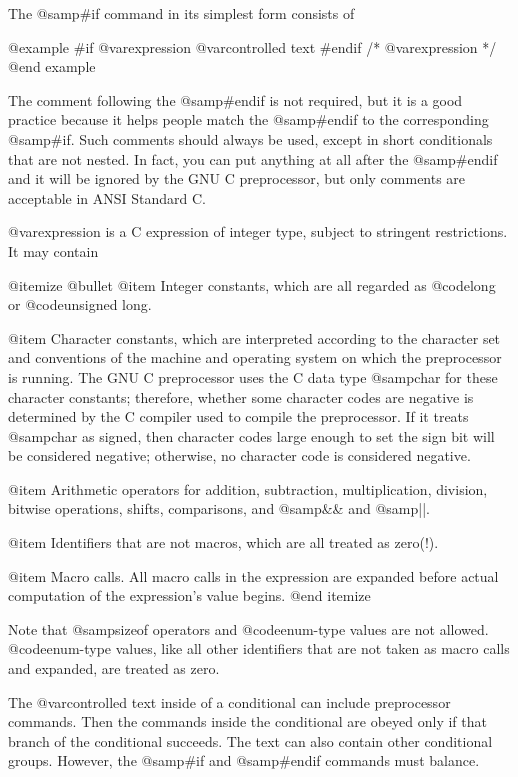 {{The @samp{#if} command in its simplest form consists of

@example
#if @var{expression}
@var{controlled text}
#endif /* @var{expression} */
@end example

The comment following the @samp{#endif} is not required, but it is a good
practice because it helps people match the @samp{#endif} to the
corresponding @samp{#if}.  Such comments should always be used, except in
short conditionals that are not nested.  In fact, you can put anything at
all after the @samp{#endif} and it will be ignored by the GNU C preprocessor,
but only comments are acceptable in ANSI Standard C.

@var{expression} is a C expression of integer type, subject to stringent
restrictions.  It may contain

@itemize @bullet
@item
Integer constants, which are all regarded as @code{long} or
@code{unsigned long}.

@item
Character constants, which are interpreted according to the character
set and conventions of the machine and operating system on which the
preprocessor is running.  The GNU C preprocessor uses the C data type
@samp{char} for these character constants; therefore, whether some
character codes are negative is determined by the C compiler used to
compile the preprocessor.  If it treats @samp{char} as signed, then
character codes large enough to set the sign bit will be considered
negative; otherwise, no character code is considered negative.

@item
Arithmetic operators for addition, subtraction, multiplication,
division, bitwise operations, shifts, comparisons, and @samp{&&} and
@samp{||}.

@item
Identifiers that are not macros, which are all treated as zero(!).

@item
Macro calls.  All macro calls in the expression are expanded before
actual computation of the expression's value begins.
@end itemize

Note that @samp{sizeof} operators and @code{enum}-type values are not allowed.
@code{enum}-type values, like all other identifiers that are not taken
as macro calls and expanded, are treated as zero.

The @var{controlled text} inside of a conditional can include
preprocessor commands.  Then the commands inside the conditional are
obeyed only if that branch of the conditional succeeds.  The text can
also contain other conditional groups.  However, the @samp{#if} and
@samp{#endif} commands must balance.

}}
